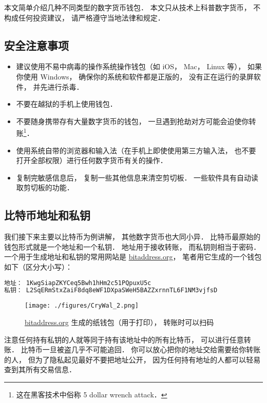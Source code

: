 
本文简单介绍几种不同类型的数字货币钱包． 本文只从技术上科普数字货币， 不构成任何投资建议， 请严格遵守当地法律和规定．

\subsection{安全注意事项}
\begin{itemize}
\item 建议使用不易中病毒的操作系统操作钱包（如 iOS， Mac， Linux 等）， 如果你使用 Windows， 确保你的系统和软件都是正版的， 没有正在运行的录屏软件， 并先进行杀毒．
\item 不要在越狱的手机上使用钱包．
\item 不要随身携带存有大量数字货币的钱包， 一旦遇到抢劫对方可能会迫使你转账\footnote{这在黑客技术中俗称 5 dollar wrench attack．}．
\item 使用系统自带的浏览器和输入法（在手机上即使使用第三方输入法， 也不要打开全部权限）进行任何数字货币有关的操作．
\item 复制完敏感信息后， 复制一些其他信息来清空剪切板． 一些软件具有自动读取剪切板的功能．
\end{itemize}

\subsection{比特币地址和私钥}
我们接下来主要以比特币为例讲解， 其他数字货币也大同小异． 比特币最原始的钱包形式就是一个地址和一个私钥． 地址用于接收转账， 而私钥则相当于密码． 一个用于生成地址和私钥的常用网站是 \href{https://www.bitaddress.org/}{bitaddress.org}， 笔者用它生成的一个钱包如下（区分大小写）：
\begin{lstlisting}[language=bash]
地址： 1KwgSiapZKYCeq5Bwh1hHm2c51PQpuxU5c
私钥： L2SqERmStxZaiF8dq8eWF1DXpaSWeH5BAZZxrnnTL6F1NM3vjfsD
\end{lstlisting}

\begin{figure}[ht]
\centering
\texttt{[image: ./figures/CryWal\_2.png]}
\caption{\href{https://www.bitaddress.org/}{bitaddress.org} 生成的纸钱包（用于打印）， 转账时可以扫码} \label{CryWal_fig2}
\end{figure}

注意任何持有私钥的人就等同于持有该地址中的所有比特币， 可以进行任意转账． 比特币一旦被盗几乎不可能追回． 你可以放心把你的地址交给需要给你转账的人， 但为了隐私起见最好不要把地址公开， 因为任何持有地址的人都可以轻易查到其所有交易信息．

